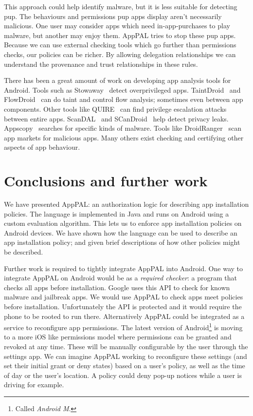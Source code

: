 \documentclass[]{llncs}
\newcommand{\comment}[1]{}%
\begin{document}
This approach could help identify malware, but it is less suitable for detecting \ac{pup}.
The behaviours and permissions \ac{pup} apps display aren't necessarily malicious.
One user may consider apps which need in-app-purchases to play malware, but another may enjoy them.
AppPAL tries to stop these \ac{pup} apps.
Because we can use external checking tools which go further than permissions checks, our policies can be richer.
By allowing delegation relationships we can understand the provenance and trust relationships in these rules.

There has been a great amount of work on developing app analysis tools for Android.
Tools such as Stowaway~\cite{Felt:2011kj} detect overprivileged apps.
TaintDroid~\cite{Enck:2010uw} and FlowDroid~\cite{Fritz:2013vi} can do taint and control flow analysis; sometimes even between app components.
Other tools like QUIRE~\cite{Bugiel:2012ui} can find privilege escalation attacks between entire apps.
ScanDAL~\cite{Kim:2012vt} and SCanDroid~\cite{Fuchs:2009vi} help detect privacy leaks.
Appscopy~\cite{Feng:kPGZr_ja} searches for specific kinds of malware.
Tools like DroidRanger~\cite{Zhou:2012tb} scan app markets for malicious apps.
Many others exist checking and certifying other aspects of app behaviour.

\section{Conclusions and further work \comment{$\frac{1}{2}$ page}}

We have presented AppPAL: an authorization logic for describing app installation policies.
The language is implemented in Java and runs on Android using a custom evaluation algorithm.
This lets us to enforce app installation policies on Android devices.
We have shown how the language can be used to describe an app installation policy;
  and given brief descriptions of how other policies might be described.

Further work is required to tightly integrate AppPAL into Android.
One way to integrate AppPAL on Android would be as a \emph{required checker}: a program that checks all apps before installation.
Google uses this API to check for known malware and jailbreak apps.
We would use AppPAL to check apps meet policies before installation.
Unfortunately the API is protected and it would require the phone to be rooted to run there.
Alternatively AppPAL could be integrated as a service to reconfigure app permissions.
The latest version of Android\footnote{Called \emph{Android M}.} is moving to a more iOS like permissions model where permissions can be granted and revoked at any time.
These will be manually configurable by the user through the settings app.
We can imagine AppPAL working to reconfigure these settings (and set their initial grant or deny states) based on a user's policy, as well as the time of day or the user's location.
A policy could deny pop-up notices while a user is driving for example.
\end{document}
